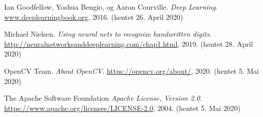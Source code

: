 \documentclass[11ot]{article}
\begin{document}
\begin{thebibliography}{9}
Ian Goodfellow, Yoshua Bengio, og Aaron Courville. 
\textit{Deep Learning}. 
\url{www.deeplearningbook.org}, 2016. (hentet 26. April 2020)

Michael Nielsen. 
\textit{Using neural nets to recognize handwritten digits}. 
\url{http://neuralnetworksanddeeplearning.com/chap1.html}, 2019. (hentet 28. April 2020)

OpenCV Team. 
\textit{About OpenCV}. 
\url{https://opencv.org/about/}, 2020. (hentet 5. Mai 2020)

The Apache Software Foundation 
\textit{Apache License, Version 2.0}. 
\url{https://www.apache.org/licenses/LICENSE-2.0}, 2004. (hentet 5. Mai 2020)

\end{thebibliography}
\end{document}
